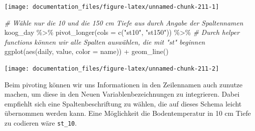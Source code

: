 \documentclass[
]{article}
\newenvironment{Shaded}{\begin{snugshade}}{\end{snugshade}}
\newcommand{\AttributeTok}[1]{\textcolor[rgb]{0.77,0.63,0.00}{#1}}
\newcommand{\CommentTok}[1]{\textcolor[rgb]{0.56,0.35,0.01}{\textit{#1}}}
\newcommand{\FunctionTok}[1]{\textcolor[rgb]{0.00,0.00,0.00}{#1}}
\newcommand{\NormalTok}[1]{#1}
\newcommand{\SpecialCharTok}[1]{\textcolor[rgb]{0.00,0.00,0.00}{#1}}
\newcommand{\StringTok}[1]{\textcolor[rgb]{0.31,0.60,0.02}{#1}}
\begin{document}
\begin{center}\texttt{[image: documentation\_files/figure-latex/unnamed-chunk-211-1]} \end{center}

\begin{Shaded}
\begin{Highlighting}[]
\CommentTok{\# Wähle nur die 10 und die 150 cm Tiefe aus durch Angabe der Spaltennamen}
\NormalTok{koog\_day }\SpecialCharTok{\%\textgreater{}\%}
  \FunctionTok{pivot\_longer}\NormalTok{(}\AttributeTok{cols =} \FunctionTok{c}\NormalTok{(}\StringTok{"st10"}\NormalTok{, }\StringTok{"st150"}\NormalTok{)) }\SpecialCharTok{\%\textgreater{}\%} \CommentTok{\# Durch helper functions können wir alle Spalten auswählen, die mit "st" beginnen}
  \FunctionTok{ggplot}\NormalTok{(}\FunctionTok{aes}\NormalTok{(daily, value, }\AttributeTok{color =}\NormalTok{ name)) }\SpecialCharTok{+}
  \FunctionTok{geom\_line}\NormalTok{()}
\end{Highlighting}
\end{Shaded}

\begin{center}\texttt{[image: documentation\_files/figure-latex/unnamed-chunk-211-2]} \end{center}

Beim pivoting können wir uns Informationen in den Zeilennamen auch zunutze machen, um diese in den Neuen Variablenbezeichnungen zu integrieren. Dabei empfiehlt sich eine Spaltenbeschriftung zu wählen, die auf dieses Schema leicht übernommen werden kann. Eine Möglichkeit die Bodentemperatur in 10 cm Tiefe zu codieren wäre \texttt{st\_10}.
\end{document}

